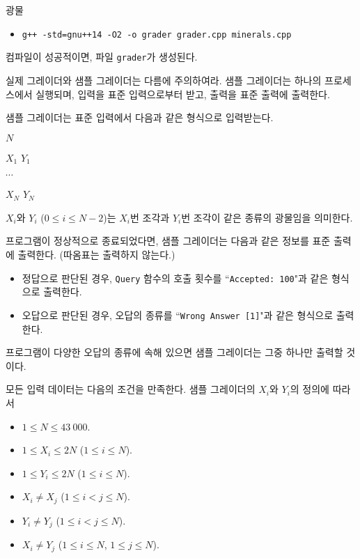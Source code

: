 \begin{problem}{광물}
	\begin{itemize}
		\item \texttt{g++ -std=gnu++14 -O2 -o grader grader.cpp minerals.cpp}
	\end{itemize}
	
	컴파일이 성공적이면, 파일 \texttt{grader}가 생성된다.
	
	실제 그레이더와 샘플 그레이더는 다름에 주의하여라. 샘플 그레이더는 하나의 프로세스에서 실행되며, 입력을 표준 입력으로부터 받고, 출력을 표준 출력에 출력한다.
	
	\InputFile
	
	샘플 그레이더는 표준 입력에서 다음과 같은 형식으로 입력받는다.
	
	$N$
	
	$X_1$ $Y_1$
	
	$\cdots$
	
	$X_N$ $Y_N$
		
	$X_i$와 $Y_i$ ($0 \le i \le N-2$)는 $X_i$번 조각과 $Y_i$번 조각이 같은 종류의 광물임을 의미한다.
	
	\OutputFile
	
	프로그램이 정상적으로 종료되었다면, 샘플 그레이더는 다음과 같은 정보를 표준 출력에 출력한다. (따옴표는 출력하지 않는다.)
	
	\begin{itemize}
		\item 정답으로 판단된 경우, \texttt{Query} 함수의 호출 횟수를 ``\texttt{Accepted: 100}"과 같은 형식으로 출력한다.
		\item 오답으로 판단된 경우, 오답의 종류를 ``\texttt{Wrong Answer [1]}"과 같은 형식으로 출력한다.
	\end{itemize}
	
	프로그램이 다양한 오답의 종류에 속해 있으면 샘플 그레이더는 그중 하나만 출력할 것이다.
	
	\Constraints
	
	모든 입력 데이터는 다음의 조건을 만족한다. 샘플 그레이더의 $X_i$와 $Y_i$의 정의에 따라서
	
	\begin{itemize}
		\item $1 \le N \le 43\ 000$.
		\item $1 \le X_i \le 2N$ ($1 \le i \le N$).
		\item $1 \le Y_i \le 2N$ ($1 \le i \le N$).
		\item $X_i \ne X_j $ ($1 \le i < j \le N$).
		\item $Y_i \ne Y_j $ ($1 \le i < j \le N$).
		\item $X_i \ne Y_j$ ($1 \le i \le N$, $1 \le j \le N$).
	\end{itemize}
	

\end{problem}
